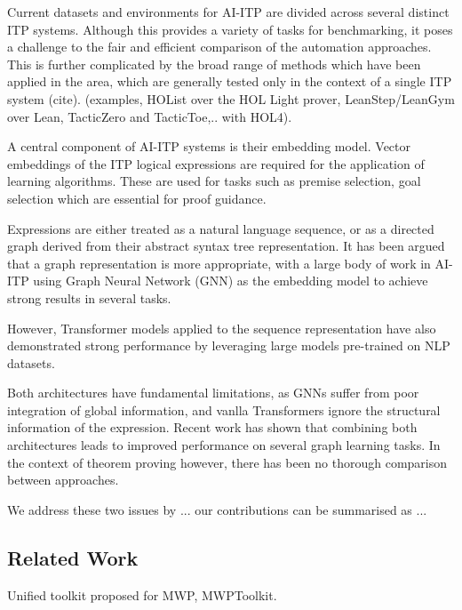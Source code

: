 \documentclass[letterpaper]{article} %
\begin{document}
Current datasets and environments for AI-ITP are divided across several distinct ITP systems.
Although this provides a variety of tasks for benchmarking,
it poses a challenge to the fair and efficient comparison of the automation approaches.
This is further complicated by the broad range of methods which have been applied in the area,
which are generally tested only in the context of a single ITP system (cite).
(examples, HOList over the HOL Light prover, LeanStep/LeanGym over Lean,
TacticZero and TacticToe,.. with HOL4).


A central component of AI-ITP systems is their embedding model.
Vector embeddings of the ITP logical expressions are required for the application of learning algorithms.
These are used for tasks such as premise selection, goal selection which are essential for proof guidance.

Expressions are either treated as a natural language sequence, or as a directed graph derived from their abstract syntax tree
representation. It has been argued that a graph representation is more appropriate, with a large body of work in AI-ITP
using Graph Neural Network (GNN) as the embedding model to achieve strong results in several tasks.

However, Transformer models applied to the sequence representation have also demonstrated strong performance by
leveraging large models pre-trained on NLP datasets.

Both architectures have fundamental limitations, as GNNs suffer from poor integration of global information, and vanlla
Transformers ignore the structural information of the expression.
Recent work has shown that combining both architectures leads to improved performance on several graph learning tasks.
In the context of theorem proving however, there has been no thorough comparison between approaches.

We address these two issues by ... our contributions can be summarised as ...

\subsection{Related Work}
Unified toolkit proposed for MWP, MWPToolkit.
\end{document}
